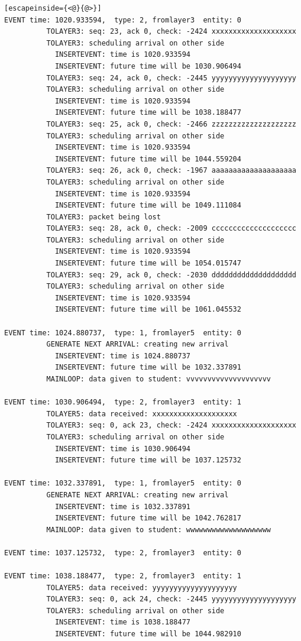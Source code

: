 \documentclass[paper=a4, fontsize=11pt]{scrartcl}
\numberwithin{equation}{section}		%
\numberwithin{figure}{section}			%
\numberwithin{table}{section}				%
\begin{document}
\begin{lstlisting}[escapeinside={<@}{@>}]
EVENT time: 1020.933594,  type: 2, fromlayer3  entity: 0
          TOLAYER3: seq: 23, ack 0, check: -2424 xxxxxxxxxxxxxxxxxxxx
          TOLAYER3: scheduling arrival on other side
            INSERTEVENT: time is 1020.933594
            INSERTEVENT: future time will be 1030.906494
          TOLAYER3: seq: 24, ack 0, check: -2445 yyyyyyyyyyyyyyyyyyyy
          TOLAYER3: scheduling arrival on other side
            INSERTEVENT: time is 1020.933594
            INSERTEVENT: future time will be 1038.188477
          TOLAYER3: seq: 25, ack 0, check: -2466 zzzzzzzzzzzzzzzzzzzz
          TOLAYER3: scheduling arrival on other side
            INSERTEVENT: time is 1020.933594
            INSERTEVENT: future time will be 1044.559204
          TOLAYER3: seq: 26, ack 0, check: -1967 aaaaaaaaaaaaaaaaaaaa
          TOLAYER3: scheduling arrival on other side
            INSERTEVENT: time is 1020.933594
            INSERTEVENT: future time will be 1049.111084
          TOLAYER3: packet being lost
          TOLAYER3: seq: 28, ack 0, check: -2009 cccccccccccccccccccc
          TOLAYER3: scheduling arrival on other side
            INSERTEVENT: time is 1020.933594
            INSERTEVENT: future time will be 1054.015747
          TOLAYER3: seq: 29, ack 0, check: -2030 dddddddddddddddddddd
          TOLAYER3: scheduling arrival on other side
            INSERTEVENT: time is 1020.933594
            INSERTEVENT: future time will be 1061.045532

EVENT time: 1024.880737,  type: 1, fromlayer5  entity: 0
          GENERATE NEXT ARRIVAL: creating new arrival
            INSERTEVENT: time is 1024.880737
            INSERTEVENT: future time will be 1032.337891
          MAINLOOP: data given to student: vvvvvvvvvvvvvvvvvvvv

EVENT time: 1030.906494,  type: 2, fromlayer3  entity: 1
          TOLAYER5: data received: xxxxxxxxxxxxxxxxxxxx
          TOLAYER3: seq: 0, ack 23, check: -2424 xxxxxxxxxxxxxxxxxxxx
          TOLAYER3: scheduling arrival on other side
            INSERTEVENT: time is 1030.906494
            INSERTEVENT: future time will be 1037.125732

EVENT time: 1032.337891,  type: 1, fromlayer5  entity: 0
          GENERATE NEXT ARRIVAL: creating new arrival
            INSERTEVENT: time is 1032.337891
            INSERTEVENT: future time will be 1042.762817
          MAINLOOP: data given to student: wwwwwwwwwwwwwwwwwwww

EVENT time: 1037.125732,  type: 2, fromlayer3  entity: 0

EVENT time: 1038.188477,  type: 2, fromlayer3  entity: 1
          TOLAYER5: data received: yyyyyyyyyyyyyyyyyyyy
          TOLAYER3: seq: 0, ack 24, check: -2445 yyyyyyyyyyyyyyyyyyyy
          TOLAYER3: scheduling arrival on other side
            INSERTEVENT: time is 1038.188477
            INSERTEVENT: future time will be 1044.982910


\end{lstlisting}
\end{document}
